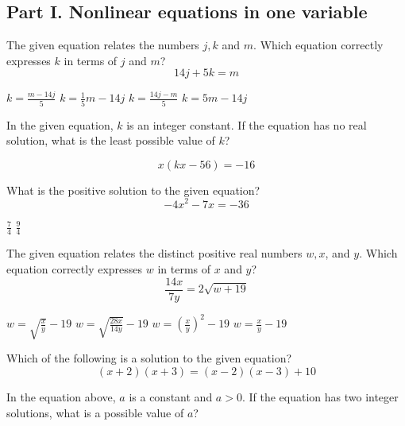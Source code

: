 
\subsection*{Part I. Nonlinear equations in one variable}

\question[1]
The given equation relates the numbers $j, k$ and $m$. Which equation correctly expresses $k$ in terms of $j$ and $m$?
\[
14 j+5 k=m
\]

\begin{choices}
  \CorrectChoice $k=\frac{m-14 j}{5}$
  \choice $k=\frac{1}{5} m-14 j$
  \choice $k=\frac{14 j-m}{5}$
  \choice $k=5 m-14 j$
\end{choices}

\question[1]
In the given equation, $k$ is an integer constant. If the equation has no real solution, what is the least possible value of $k$?

\[
x(k x-56)=-16
\]

\begin{solutionorbox}[1in]
\end{solutionorbox}

\question[1]
What is the positive solution to the given equation?
\[
-4 x^{2}-7 x=-36
\]
\begin{choices}
  \choice $\frac{7}{4}$
  \CorrectChoice $\frac{9}{4}$
\end{choices}

\question[1]
The given equation relates the distinct positive real numbers $w, x$, and $y$. Which equation correctly expresses $w$ in terms of $x$ and $y$?
\[
\frac{14 x}{7 y}=2 \sqrt{w+19}
\]
\begin{choices}
  \choice $w=\sqrt{\frac{x}{y}}-19$
  \choice $w=\sqrt{\frac{28 x}{14 y}}-19$
  \CorrectChoice $w=\left(\frac{x}{y}\right)^{2}-19$
  \choice $w=\frac{x}{y}-19$
\end{choices}

\question[1]
Which of the following is a solution to the given equation?
\[
(x+2)(x+3)=(x-2)(x-3)+10
\]
\begin{choices}
\end{choices}

\question[1]
In the equation above, $a$ is a constant and $a>0$. If the equation has two integer solutions, what is a possible value of $a$?


